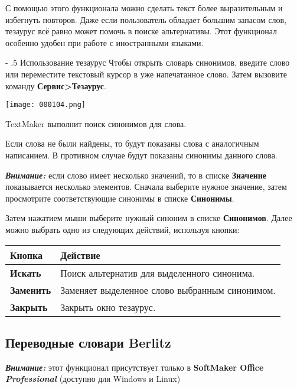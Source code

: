 ﻿\documentclass[a4paper,10pt]{article}
\makeatletter
\renewcommand\paragraph{%
   \@startsection{paragraph}{4}{0mm}%
      {-\baselineskip}%
      {.5\baselineskip}%
      {\normalfont\normalsize\bfseries}}
\makeatother
\begin{document}
С помощью этого функционала можно сделать текст более выразительным и избегнуть повторов. Даже если пользователь обладает большим запасом слов, тезаурус всё равно может помочь в поиске альтернативы. Этот функционал особенно удобен при работе с иностранными языками.

\paragraph{Использование тезаурус}
Чтобы открыть словарь синонимов, введите слово или переместите текстовый курсор в уже напечатанное слово. Затем вызовите команду \textbf{Сервис>Тезаурус}.

\texttt{[image: 000104.png]}

TextMaker выполнит поиск синонимов для слова.

Если слова не были найдены, то будут показаны слова с аналогичным написанием. В противном случае будут показаны синонимы данного слова.

\begin{mdframed}[backgroundcolor=blue!10]
\textbf{\textit{Внимание:}} если слово имеет несколько значений, то в списке \textbf{Значение} показывается несколько элементов. Сначала выберите нужное значение, затем просмотрите соответствующие синонимы в списке \textbf{Синонимы}.
\end{mdframed}

Затем нажатием мыши выберите нужный синоним в списке \textbf{Синонимов}. Далее можно выбрать одно из следующих действий, используя кнопки:

\begin{center}
\begin{tabular}{  m{4cm}  m{12cm}  }
 \textbf{Кнопка} & \textbf{Действие}\\ 
 \hline
  \textbf{Искать} & Поиск альтернатив для выделенного синонима.\\
  \textbf{Заменить} & Заменяет выделенное слово выбранным синонимом.\\ 
\textbf{Закрыть} & Закрыть окно тезаурус.\\
\end{tabular}
\end{center}

\subsection{Переводные словари Berlitz}
\begin{mdframed}[backgroundcolor=blue!10]
\textbf{\textit{Внимание:}} этот функционал присутствует только в \textbf{SoftMaker Office \textit{Professional}} (доступно для Windows и Linux)
\end{mdframed}
\end{document}
